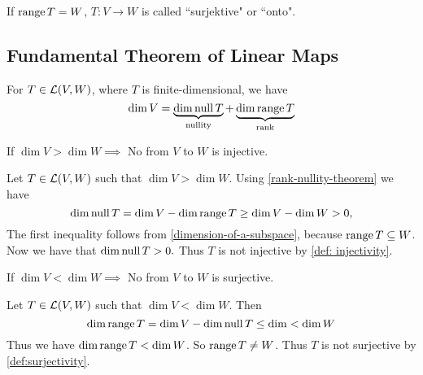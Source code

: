 \setcounter{thm}{18}
\begin{mydef} [surjectivity]
  \label{def:surjectivity}
  If $\operatorname{range} T=W$, $T:V\to W$ is called ``surjektive" or ``onto".
\end{mydef}

\subsection{Fundamental Theorem of Linear Maps}
  \setcounter{thm}{20}
  \begin{thm} 
    \label{rank-nullity-theorem}
    For $T \in {\mathcal{L}(V,W)}$, where $T$ is finite-dimensional, we have
    \begin{equation}
      \dim V =
      \underbrace{ \dim \operatorname{null} T }_{\text{nullity}}
      + \underbrace{\dim \operatorname{range} T}_{\text{rank}}
    \end{equation}
  \end{thm}

  \setcounter{thm}{21}
  \begin{thm} 
    \label{thm: linear-map-to-a-lower-dimensional-space-is-not-injective}
    If $\dim V > \dim W \implies$ No \lm from $V$ to $W$ is injective.
  \end{thm}
  \begin{prf} Let $T\in \mathcal{L}(V,W)$ such that $\dim V > \dim W$. Using \ref{rank-nullity-theorem} we have
    \begin{equation}
      \dim \operatorname{null} T = \dim V - \dim \operatorname{range} T \geq \dim V - \dim W > 0,
    \end{equation}
    The first inequality follows from \ref{dimension-of-a-subspace}, because $\operatorname{range} T \subseteq W$. Now we have that $\dim \operatorname{null} T > 0.$ Thus $T$ is not injective by \autoref{def: injectivity}.
    
  \end{prf}

  \setcounter{thm}{23}
  \begin{thm} 
    If $\dim V < \dim W \implies$ No \lm from $V$ to $W$ is surjective.
  \end{thm}
  \begin{prf}
    Let $T\in \mathcal{L} (V,W)$ such that $\dim V < \dim W$. Then
    \begin{equation}
      \dim \operatorname{range} T = \dim V - \dim \operatorname{null} T \leq \dim < \dim W
    \end{equation}
    Thus we have $\dim \operatorname{range} T < \dim W$. So $\operatorname{range} T \neq W$. Thus $T$ is not surjective by \autoref{def:surjectivity}.
    
  \end{prf}
   
